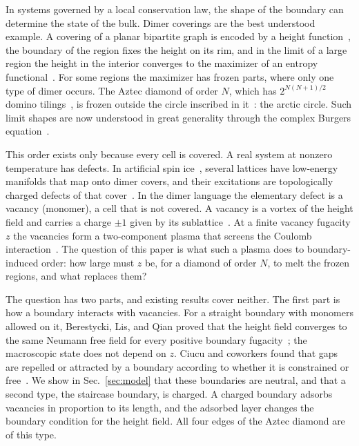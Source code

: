 \documentclass[reprint,aps,pre,superscriptaddress,longbibliography,floatfix,amsmath,amssymb]{revtex4-2}
\begin{document}
In systems governed by a local conservation law, the shape of the boundary can determine the state of the bulk. Dimer coverings are the best understood example. A covering of a planar bipartite graph is encoded by a height function~\cite{TODO-thurston1990}, the boundary of the region fixes the height on its rim, and in the limit of a large region the height in the interior converges to the maximizer of an entropy functional~\cite{cohn2001}. For some regions the maximizer has frozen parts, where only one type of dimer occurs. The Aztec diamond of order $N$, which has $2^{N(N+1)/2}$ domino tilings~\cite{TODO-elkies1992}, is frozen outside the circle inscribed in it~\cite{TODO-jockusch1998,TODO-cohn1996}: the arctic circle. Such limit shapes are now understood in great generality through the complex Burgers equation~\cite{kenyon2007}.

This order exists only because every cell is covered. A real system at nonzero temperature has defects. In artificial spin ice~\cite{TODO-wang2006,TODO-nisoli2013}, several lattices have low-energy manifolds that map onto dimer covers, and their excitations are topologically charged defects of that cover~\cite{lao2018}. %
In the dimer language the elementary defect is a vacancy (monomer), a cell that is not covered. A vacancy is a vortex of the height field and carries a charge $\pm 1$ given by its sublattice~\cite{TODO-fisher1963}. At a finite vacancy fugacity $z$ the vacancies form a two-component plasma that screens the Coulomb interaction~\cite{krauth2003,TODO-papanikolaou2007}. The question of this paper is what such a plasma does to boundary-induced order: how large must $z$ be, for a diamond of order $N$, to melt the frozen regions, and what replaces them?

The question has two parts, and existing results cover neither. The first part is how a boundary interacts with vacancies. For a straight boundary with monomers allowed on it, Berestycki, Lis, and Qian proved that the height field converges to the same Neumann free field for every positive boundary fugacity~\cite{berestycki2023}; the macroscopic state does not depend on $z$. Ciucu and coworkers found that gaps are repelled or attracted by a boundary according to whether it is constrained or free~\cite{ciucu2011,ciucu2014}. We show in Sec.~\ref{sec:model} that these boundaries are neutral, and that a second type, the staircase boundary, is charged. A charged boundary adsorbs vacancies in proportion to its length, and the adsorbed layer changes the boundary condition for the height field. All four edges of the Aztec diamond are of this type.
\end{document}
